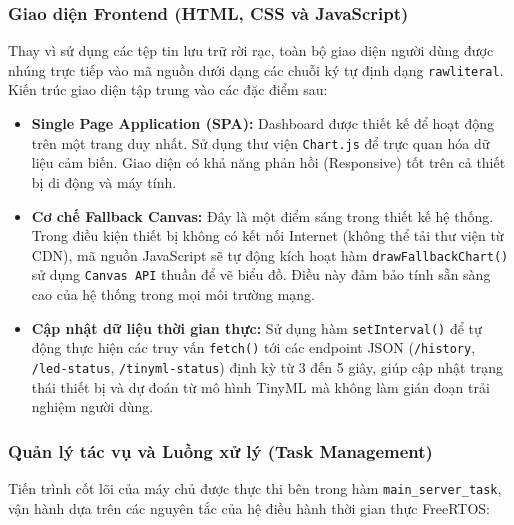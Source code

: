 \subsubsection{Giao diện Frontend (HTML, CSS và JavaScript)}

Thay vì sử dụng các tệp tin lưu trữ rời rạc, toàn bộ giao diện người dùng được nhúng trực tiếp vào mã nguồn dưới dạng các chuỗi ký tự định dạng \texttt{rawliteral}. Kiến trúc giao diện tập trung vào các đặc điểm sau:

\begin{itemize}
    \item \textbf{Single Page Application (SPA):} Dashboard được thiết kế để hoạt động trên một trang duy nhất. Sử dụng thư viện \texttt{Chart.js} để trực quan hóa dữ liệu cảm biến. Giao diện có khả năng phản hồi (Responsive) tốt trên cả thiết bị di động và máy tính.
    
    \item \textbf{Cơ chế Fallback Canvas:} Đây là một điểm sáng trong thiết kế hệ thống. Trong điều kiện thiết bị không có kết nối Internet (không thể tải thư viện từ CDN), mã nguồn JavaScript sẽ tự động kích hoạt hàm \texttt{drawFallbackChart()} sử dụng \texttt{Canvas API} thuần để vẽ biểu đồ. Điều này đảm bảo tính sẵn sàng cao của hệ thống trong mọi môi trường mạng.
    
    \item \textbf{Cập nhật dữ liệu thời gian thực:} Sử dụng hàm \texttt{setInterval()} để tự động thực hiện các truy vấn \texttt{fetch()} tới các endpoint JSON (\texttt{/history}, \texttt{/led-status}, \texttt{/tinyml-status}) định kỳ từ 3 đến 5 giây, giúp cập nhật trạng thái thiết bị và dự đoán từ mô hình TinyML mà không làm gián đoạn trải nghiệm người dùng.
\end{itemize}

\subsubsection{Quản lý tác vụ và Luồng xử lý (Task Management)}

Tiến trình cốt lõi của máy chủ được thực thi bên trong hàm \texttt{main\_server\_task}, vận hành dựa trên các nguyên tắc của hệ điều hành thời gian thực FreeRTOS:

